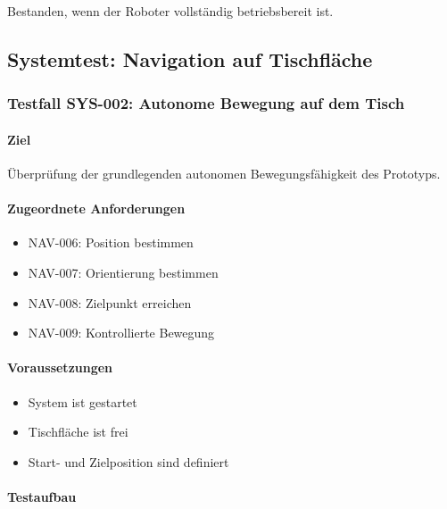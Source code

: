 \documentclass[
  a4paper,
  12pt,
  DIV=12,        %
  parskip=half,  %
  headings=small %
]{scrartcl}
\theoremstyle{definition}
\providecommand{\tightlist}{%
  \setlength{\itemsep}{0pt}\setlength{\parskip}{0pt}}
\theoremstyle{definition}
\begin{document}
Bestanden, wenn der Roboter vollständig betriebsbereit ist.

\subsection{Systemtest: Navigation auf
Tischfläche}\label{systemtest-navigation-auf-tischfluxe4che}

\subsubsection{Testfall SYS-002: Autonome Bewegung auf dem
Tisch}\label{testfall-sys-002-autonome-bewegung-auf-dem-tisch}

\paragraph{Ziel}\label{ziel-25}

Überprüfung der grundlegenden autonomen Bewegungsfähigkeit des
Prototyps.

\paragraph{Zugeordnete
Anforderungen}\label{zugeordnete-anforderungen-25}

\begin{itemize}
\tightlist
\item
  NAV-006: Position bestimmen
\item
  NAV-007: Orientierung bestimmen
\item
  NAV-008: Zielpunkt erreichen
\item
  NAV-009: Kontrollierte Bewegung
\end{itemize}

\paragraph{Voraussetzungen}\label{voraussetzungen-24}

\begin{itemize}
\tightlist
\item
  System ist gestartet
\item
  Tischfläche ist frei
\item
  Start- und Zielposition sind definiert
\end{itemize}

\paragraph{Testaufbau}\label{testaufbau-1}
\end{document}

